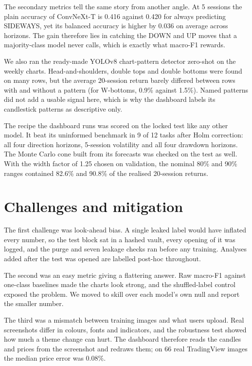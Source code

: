\documentclass[11pt,a4paper]{article}
\begin{document}
The secondary metrics tell the same story from another angle. At 5 sessions the plain accuracy of ConvNeXt-T is 0.416 against 0.420 for always predicting SIDEWAYS, yet its balanced accuracy is higher by 0.036 on average across horizons. The gain therefore lies in catching the DOWN and UP moves that a majority-class model never calls, which is exactly what macro-F1 rewards.

We also ran the ready-made YOLOv8 chart-pattern detector zero-shot on the weekly charts. Head-and-shoulders, double tops and double bottoms were found on many rows, but the average 20-session return barely differed between rows with and without a pattern (for W-bottoms, 0.9\% against 1.5\%). Named patterns did not add a usable signal here, which is why the dashboard labels its candlestick patterns as descriptive only.

The recipe the dashboard runs was scored on the locked test like any other model. It beat its uninformed benchmark in 9 of 12 tasks after Holm correction: all four direction horizons, 5-session volatility and all four drawdown horizons. The Monte Carlo cone built from its forecasts was checked on the test as well. With the width factor of 1.25 chosen on validation, the nominal 80\% and 90\% ranges contained 82.6\% and 90.8\% of the realised 20-session returns.

\section{Challenges and mitigation}

The first challenge was look-ahead bias. A single leaked label would have inflated every number, so the test block sat in a hashed vault, every opening of it was logged, and the purge and seven leakage checks ran before any training. Analyses added after the test was opened are labelled post-hoc throughout.

The second was an easy metric giving a flattering answer. Raw macro-F1 against one-class baselines made the charts look strong, and the shuffled-label control exposed the problem. We moved to skill over each model's own null and report the smaller number.

The third was a mismatch between training images and what users upload. Real screenshots differ in colours, fonts and indicators, and the robustness test showed how much a theme change can hurt. The dashboard therefore reads the candles and prices from the screenshot and redraws them; on 66 real TradingView images the median price error was 0.08\%.
\end{document}
